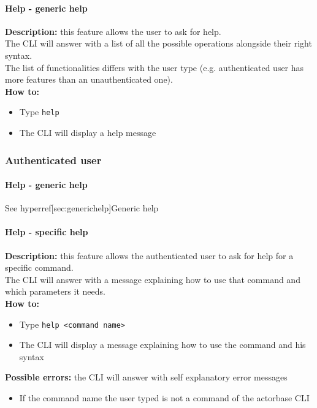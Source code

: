 \documentclass{scalatekids-article}
\begin{document}
\paragraph{Help - generic help}
\label{sec:generichelp}
\textbf{Description:} this feature allows the user to ask for help.\\
The CLI will answer with a list of all the possible operations alongside
their right syntax.\\
The list of functionalities differs with the user type (e.g. authenticated user has more features than an unauthenticated one).\\
\textbf{How to:} 
\begin{itemize}
	\item Type \texttt{help} 
	\item The CLI will display a help message
\end{itemize}

\subsubsection{Authenticated user}
\label{sec:authenticateduser}

\paragraph{Help - generic help}

See hyperref[sec:generichelp]{Generic help}

\paragraph{Help - specific help}
\label{sec:specifichelp}
\textbf{Description:} this feature allows the authenticated user to ask for help for 
a specific command.\\
The CLI will answer with a message explaining how to use that command and 
which parameters it needs.\\
\textbf{How to:} 
\begin{itemize}
	\item Type \texttt{help <command name>}
	\item The CLI will display a message explaining how to use the command and his syntax
\end{itemize}
\textbf{Possible errors:} the CLI will answer with self explanatory error messages 
\begin{itemize}
	\item If the command name the user typed is not a command of the actorbase CLI
\end{itemize}
\end{document}
